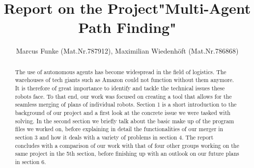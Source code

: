 \documentclass{llncs}
\begin{document}
\hypersetup{
    colorlinks=true,
    linkcolor=blue,
    filecolor=magenta,      
    urlcolor=cyan,
    bookmarks=true,
    pdfpagemode=FullScreen,
}
\mainmatter  %

\title{Report on the Project\newline"Multi-Agent Path Finding"}

\titlerunning{}

%
%
\author{Marcus Funke (Mat.Nr.787912), Maximilian Wiedenhöft (Mat.Nr.786868)}
%
\authorrunning{}


%
%


\maketitle


\begin{abstract}
The use of autonomous agents has become widespread in the field of logistics. The warehouses of tech giants such as Amazon could not function without them anymore. It is therefore of great  importance to identify and tackle the technical issues these robots face. To that end, our work was focused on creating a tool that allows for the seamless merging of plans of individual robots.\newline
Section 1 is a short introduction to the background of our project and a first look at the concrete issue we were tasked with solving. In the second section we briefly talk about the basic make up of the program files we worked on, before explaining in detail the functionalities of our merger in section 3 and how it deals with a variety of problems in section 4.\newline
The report concludes with a comparison of our work with that of four other groups working on the same project in the 5th section, before finishing up with an outlook on our future plans in section 6.
\end{abstract}
\tableofcontents
\end{document}
